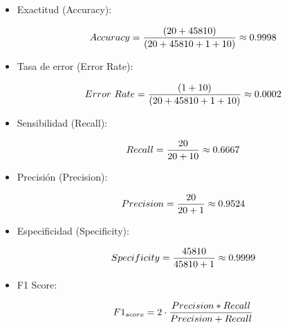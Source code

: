       \begin{itemize}
            \item  Exactitud (Accuracy):

                  \begin{align}
                        Accuracy = \frac{(20+45810)}{(20+45810+1+10)}\approx 0.9998 \notag \\
                        \label{eq:accuracy_optimized}
                  \end{align}
            \item Tasa de error (Error Rate):

                  \begin{align}
                        Error\ Rate = \frac{(1+10)}{(20+45810+1+10)}\approx 0.0002 \notag \\
                        \label{eq:error_rate_optimized}
                  \end{align}
            \item Sensibilidad (Recall):

                  \begin{align}
                        Recall = \frac{20}{20+10}\approx 0.6667 \notag \\
                        \label{eq:recall_optimized}
                  \end{align}
            \item Precisión (Precision): 

                  \begin{align}
                        Precision = \frac{20}{20+1}\approx 0.9524 \notag \\
                        \label{eq:precision_optimized}
                  \end{align}
            \item Especificidad (Specificity): 

                  \begin{align}
                        Specificity = \frac{45810}{45810+1}\approx 0.9999 \notag \\
                        \label{eq:specificity_optimized}
                  \end{align}
            \item F1 Score:  

                  \begin{align}
                        F1_{score} = 2 \cdot \frac{Precision * Recall}{Precision+Recall} \notag \\
                        \label{eq:f1_optimized}
                  \end{align}
      \end{itemize}

